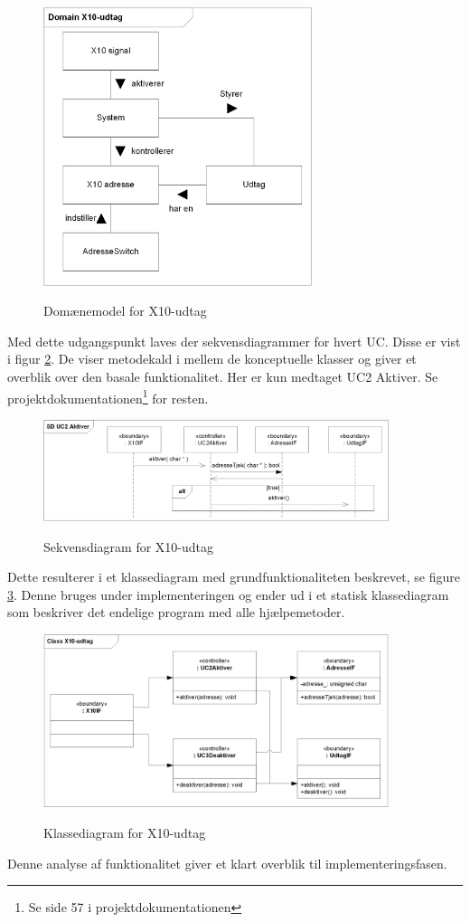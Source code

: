 \begin{figure}[!htb]
     \centering
     { \includegraphics[width=0.7\textwidth]{Billeder/UML/X10_modtager_Domain}}
     \caption{Domænemodel for X10-udtag}
     \label{fig:X10_udtag_domaenemodel}
\end{figure}

Med dette udgangspunkt laves der sekvensdiagrammer for hvert UC. Disse er vist i figur \ref{fig:X10_udtag_sd}. De viser metodekald i mellem de konceptuelle klasser og giver et overblik over den basale funktionalitet. Her er kun medtaget UC2 Aktiver. Se projektdokumentationen\footnote{Se side 57 i projektdokumentationen} for resten.

\begin{figure}[!htb]
     \centering
     { \includegraphics[width=0.9\textwidth]{Billeder/UML/X10_modtager_SD}}
     \caption{Sekvensdiagram for X10-udtag}
     \label{fig:X10_udtag_sd}
\end{figure}

Dette resulterer i et klassediagram med grundfunktionaliteten beskrevet, se figure \ref{fig:X10_udtag_class}. Denne bruges under implementeringen og ender ud i et statisk klassediagram som beskriver det endelige program med alle hjælpemetoder.

\begin{figure}[!htb]
     \centering
     { \includegraphics[width=0.9\textwidth]{Billeder/UML/X10_modtager_Class}}
     \caption{Klassediagram for X10-udtag}
     \label{fig:X10_udtag_class}
\end{figure}

Denne analyse af funktionalitet giver et klart overblik til implementeringsfasen.